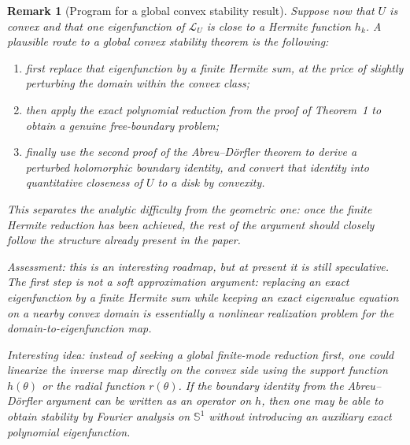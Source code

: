 \documentclass[a4paper,11pt,reqno]{amsart}
\newtheorem{remark}{Remark}[section]
\begin{document}
\begin{remark}[Program for a global convex stability result]
Suppose now that \(U\) is convex and that one eigenfunction of
\(\mathcal L_U\) is close to a Hermite function \(h_k\). A plausible route to a
global convex stability theorem is the following:
\begin{enumerate}
\item first replace that eigenfunction by a finite Hermite sum, at the price of
slightly perturbing the domain within the convex class;
\item then apply the exact polynomial reduction from the proof of Theorem~1 to
obtain a genuine free-boundary problem;
\item finally use the second proof of the Abreu--D\"orfler theorem to derive a
perturbed holomorphic boundary identity, and convert that identity into
quantitative closeness of \(U\) to a disk by convexity.
\end{enumerate}
This separates the analytic difficulty from the geometric one: once the finite
Hermite reduction has been achieved, the rest of the argument should closely
follow the structure already present in the paper.

Assessment: this is an interesting roadmap, but at present it is still
speculative. The first step is not a soft approximation argument: replacing an
exact eigenfunction by a finite Hermite sum while keeping an exact eigenvalue
equation on a nearby convex domain is essentially a nonlinear realization
problem for the domain-to-eigenfunction map.

Interesting idea: instead of seeking a global finite-mode reduction first, one
could linearize the inverse map directly on the convex side using the support
function \(h(\theta)\) or the radial function \(r(\theta)\). If the boundary
identity from the Abreu--D\"orfler argument can be written as an operator on
\(h\), then one may be able to obtain stability by Fourier analysis on
\(\mathbb S^1\) without introducing an auxiliary exact polynomial eigenfunction.
\end{remark}
\end{document}

